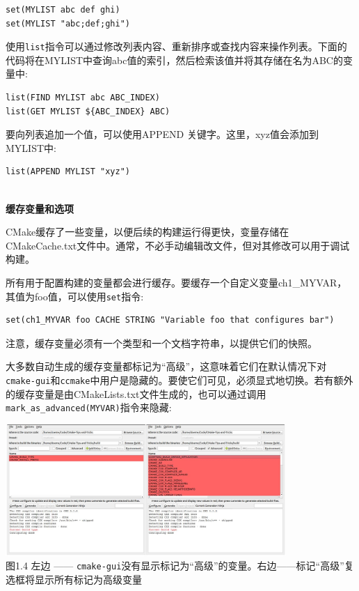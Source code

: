 \begin{lstlisting}[style=styleCMake]
set(MYLIST abc def ghi)
set(MYLIST "abc;def;ghi")
\end{lstlisting}

使用\texttt{list}指令可以通过修改列表内容、重新排序或查找内容来操作列表。下面的代码将在MYLIST中查询abc值的索引，然后检索该值并将其存储在名为ABC的变量中:

\begin{lstlisting}[style=styleCMake]
list(FIND MYLIST abc ABC_INDEX)
list(GET MYLIST ${ABC_INDEX} ABC)
\end{lstlisting}

要向列表追加一个值，可以使用APPEND 关键字。这里，xyz值会添加到MYLIST中:

\begin{lstlisting}[style=styleCMake]
list(APPEND MYLIST "xyz")
\end{lstlisting}

\hspace*{\fill} \\ %
\noindent
\textbf{缓存变量和选项}

CMake缓存了一些变量，以便后续的构建运行得更快，变量存储在CMakeCache.txt文件中。通常，不必手动编辑改文件，但对其修改可以用于调试构建。

所有用于配置构建的变量都会进行缓存。要缓存一个自定义变量ch1\_MYVAR，其值为foo值，可以使用\texttt{set}指令:

\begin{lstlisting}[style=styleCMake]
set(ch1_MYVAR foo CACHE STRING "Variable foo that configures bar")
\end{lstlisting}

注意，缓存变量必须有一个类型和一个文档字符串，以提供它们的快照。

大多数自动生成的缓存变量都标记为“高级”，这意味着它们在默认情况下对\texttt{cmake-gui}和\texttt{ccmake}中用户是隐藏的。要使它们可见，必须显式地切换。若有额外的缓存变量是由CMakeLists.txt文件生成的，也可以通过调用\texttt{mark\_as\_advanced(MYVAR)}指令来隐藏:

\begin{center}
\includegraphics[width=0.8\textwidth]{content/1/chapter1/images/4.jpg}\\
图1.4  左边 —— \texttt{cmake-gui}没有显示标记为“高级”的变量。右边——标记“高级”复选框将显示所有标记为高级变量
\end{center}

